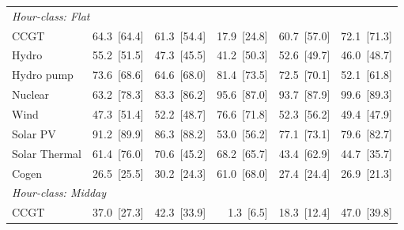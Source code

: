 \begin{tabular}{l r r r r r}
\midrule
\multicolumn{6}{l}{\textit{Hour-class: Flat}} \\
CCGT & 64.3~{\color{seasoncol}\scriptsize[64.4]} & 61.3~{\color{seasoncol}\scriptsize[54.4]} & 17.9~{\color{seasoncol}\scriptsize[24.8]} & 60.7~{\color{seasoncol}\scriptsize[57.0]} & 72.1~{\color{seasoncol}\scriptsize[71.3]} \\
Hydro & 55.2~{\color{seasoncol}\scriptsize[51.5]} & 47.3~{\color{seasoncol}\scriptsize[45.5]} & 41.2~{\color{seasoncol}\scriptsize[50.3]} & 52.6~{\color{seasoncol}\scriptsize[49.7]} & 46.0~{\color{seasoncol}\scriptsize[48.7]} \\
Hydro pump & 73.6~{\color{seasoncol}\scriptsize[68.6]} & 64.6~{\color{seasoncol}\scriptsize[68.0]} & 81.4~{\color{seasoncol}\scriptsize[73.5]} & 72.5~{\color{seasoncol}\scriptsize[70.1]} & 52.1~{\color{seasoncol}\scriptsize[61.8]} \\
Nuclear & 63.2~{\color{seasoncol}\scriptsize[78.3]} & 83.3~{\color{seasoncol}\scriptsize[86.2]} & 95.6~{\color{seasoncol}\scriptsize[87.0]} & 93.7~{\color{seasoncol}\scriptsize[87.9]} & 99.6~{\color{seasoncol}\scriptsize[89.3]} \\
Wind & 47.3~{\color{seasoncol}\scriptsize[51.4]} & 52.2~{\color{seasoncol}\scriptsize[48.7]} & 76.6~{\color{seasoncol}\scriptsize[71.8]} & 52.3~{\color{seasoncol}\scriptsize[56.2]} & 49.4~{\color{seasoncol}\scriptsize[47.9]} \\
Solar PV & 91.2~{\color{seasoncol}\scriptsize[89.9]} & 86.3~{\color{seasoncol}\scriptsize[88.2]} & 53.0~{\color{seasoncol}\scriptsize[56.2]} & 77.1~{\color{seasoncol}\scriptsize[73.1]} & 79.6~{\color{seasoncol}\scriptsize[82.7]} \\
Solar Thermal & 61.4~{\color{seasoncol}\scriptsize[76.0]} & 70.6~{\color{seasoncol}\scriptsize[45.2]} & 68.2~{\color{seasoncol}\scriptsize[65.7]} & 43.4~{\color{seasoncol}\scriptsize[62.9]} & 44.7~{\color{seasoncol}\scriptsize[35.7]} \\
Cogen & 26.5~{\color{seasoncol}\scriptsize[25.5]} & 30.2~{\color{seasoncol}\scriptsize[24.3]} & 61.0~{\color{seasoncol}\scriptsize[68.0]} & 27.4~{\color{seasoncol}\scriptsize[24.4]} & 26.9~{\color{seasoncol}\scriptsize[21.3]} \\
\midrule
\multicolumn{6}{l}{\textit{Hour-class: Midday}} \\
CCGT & 37.0~{\color{seasoncol}\scriptsize[27.3]} & 42.3~{\color{seasoncol}\scriptsize[33.9]} & 1.3~{\color{seasoncol}\scriptsize[6.5]} & 18.3~{\color{seasoncol}\scriptsize[12.4]} & 47.0~{\color{seasoncol}\scriptsize[39.8]} \\

\end{tabular}
